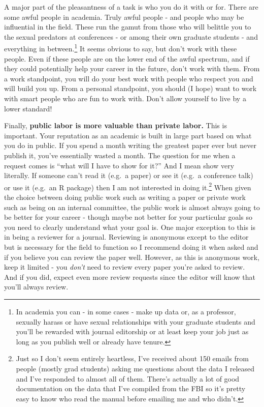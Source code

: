 \documentclass[
  12pt,
  openany]{book}
\begin{document}
A major part of the pleasantness of a task is who you do it with or for. There are some awful people in academia. Truly awful people - and people who may be influential in the field. These run the gamut from those who will belittle you to the sexual predators at conferences - or among their own graduate students - and everything in between.\footnote{In academia you can - in some cases - make up data or, as a professor, sexually harass or have sexual relationships with your graduate students and you'll be rewarded with journal editorship or at least keep your job just as long as you publish well or already have tenure.} It seems obvious to say, but don't work with these people. Even if these people are on the lower end of the awful spectrum, and if they could potentially help your career in the future, don't work with them. From a work standpoint, you will do your best work with people who respect you and will build you up. From a personal standpoint, you should (I hope) want to work with smart people who are fun to work with. Don't allow yourself to live by a lower standard!

Finally, \textbf{public labor is more valuable than private labor.} This is important. Your reputation as an academic is built in large part based on what you do in public. If you spend a month writing the greatest paper ever but never publish it, you've essentially wasted a month. The question for me when a request comes is ``what will I have to show for it?'' And I mean show very literally. If someone can't read it (e.g.~a paper) or see it (e.g.~a conference talk) or use it (e.g.~an R package) then I am not interested in doing it.\footnote{Just so I don't seem entirely heartless, I've received about 150 emails from people (mostly grad students) asking me questions about the data I released and I've responded to almost all of them. There's actually a lot of good documentation on the data that I've compiled from the FBI so it's pretty easy to know who read the manual before emailing me and who didn't.} When given the choice between doing public work such as writing a paper or private work such as being on an internal committee, the public work is almost always going to be better for your career - though maybe not better for your particular goals so you need to clearly understand what your goal is. One major exception to this is in being a reviewer for a journal. Reviewing is anonymous except to the editor but is necessary for the field to function so I recommend doing it when asked and if you believe you can review the paper well. However, as this is anonymous work, keep it limited - you \emph{don't} need to review every paper you're asked to review. And if you did, expect even more review requests since the editor will know that you'll always review.
\end{document}
